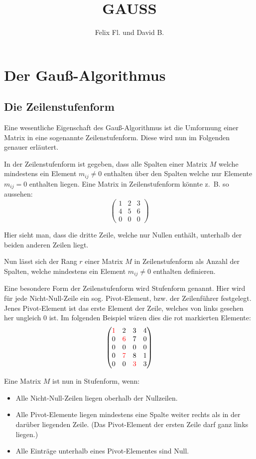 \documentclass{scrartcl}
\title{GAUSS}
\author{Felix Fl. und David B.}
\begin{document}
\maketitle

\tableofcontents
\newpage

\section{Der Gauß-Algorithmus}


\subsection{Die Zeilenstufenform}
Eine wesentliche Eigenschaft des Gauß-Algorithmus ist die Umformung einer Matrix in eine sogenannte Zeilenstufenform. Diese wird nun im Folgenden genauer erläutert.

In der Zeilenstufenform ist gegeben, dass alle Spalten einer Matrix $M$ welche mindestens ein Element $m_{ij} \neq 0$ enthalten über den Spalten welche nur Elemente $m_{ij} = 0$ enthalten liegen.
Eine Matrix in Zeilenstufenform könnte z.~B. so aussehen:
\[ \begin{pmatrix} 1 & 2 & 3 \\ 4 & 5 & 6 \\ 0 & 0 & 0 \end{pmatrix} \]

Hier sieht man, dass die dritte Zeile, welche nur Nullen enthält, unterhalb der beiden anderen Zeilen liegt.

Nun lässt sich der Rang $r$ einer Matrix $M$ in Zeilenstufenform als Anzahl der Spalten, welche mindestens ein Element $m_{ij} \neq 0$ enthalten definieren.

Eine besondere Form der Zeilenstufenform wird Stufenform genannt. Hier wird für jede Nicht-Null-Zeile ein sog. Pivot-Element, bzw. der Zeilenführer festgelegt.
Jenes Pivot-Element ist das erste Element der Zeile, welches von links gesehen her ungleich 0 ist. Im folgenden Beispiel wären dies die rot markierten Elemente:
\[ \begin{pmatrix}{\color{red}1}& 2 & 3 & 4\\ 0 &{\color{red}6}& 7 & 0 \\ 0 & 0 & 0 & 0 \\ 0 &{\color{red}7}& 8 & 1 \\ 0 & 0 &{\color{red}3}& 3 \end{pmatrix} \]

Eine Matrix $M$ ist nun in Stufenform, wenn:
\begin{itemize}
\item Alle Nicht-Null-Zeilen liegen oberhalb der Nullzeilen.
\item Alle Pivot-Elemente liegen mindestens eine Spalte weiter rechts als in der darüber liegenden Zeile. (Das Pivot-Element der ersten Zeile darf ganz links liegen.)
\item Alle Einträge unterhalb eines Pivot-Elementes sind Null.
\end{itemize}
\end{document}
